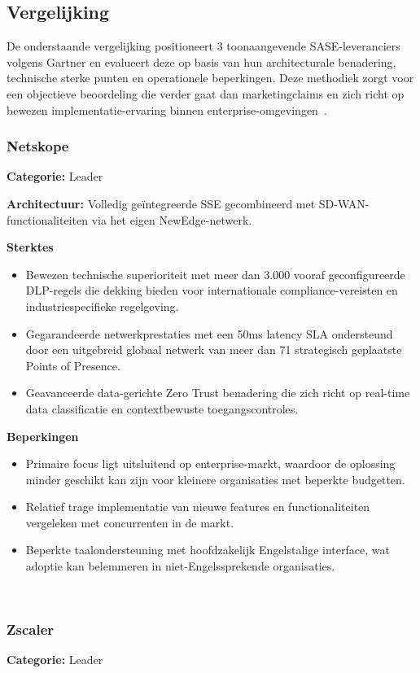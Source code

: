 \subsection{Vergelijking}
De onderstaande vergelijking positioneert 3 toonaangevende SASE-leveranciers volgens Gartner en evalueert deze op basis van hun architecturale benadering, technische sterke punten en operationele beperkingen. Deze methodiek zorgt voor een objectieve beoordeling die verder gaat dan marketingclaims en zich richt op bewezen implementatie-ervaring binnen enterprise-omgevingen~\autocite{Gartner2025}.

\subsubsection{Netskope}
\textbf{Categorie:} Leader

\textbf{Architectuur:}  Volledig geïntegreerde SSE gecombineerd met SD-WAN-functionaliteiten via het eigen NewEdge-netwerk.

\textbf{Sterktes}
\begin{itemize}
    \item Bewezen technische superioriteit met meer dan 3.000 vooraf geconfigureerde DLP-regels die dekking bieden voor internationale compliance-vereisten en industriespecifieke regelgeving.
    \item Gegarandeerde netwerkprestaties met een 50ms latency SLA ondersteund door een uitgebreid globaal netwerk van meer dan 71 strategisch geplaatste Points of Presence.
    \item Geavanceerde data-gerichte Zero Trust benadering die zich richt op real-time data classificatie en contextbewuste toegangscontroles.
\end{itemize}

\textbf{Beperkingen}
\begin{itemize}
    \item Primaire focus ligt uitsluitend op enterprise-markt, waardoor de oplossing minder geschikt kan zijn voor kleinere organisaties met beperkte budgetten.
    \item Relatief trage implementatie van nieuwe features en functionaliteiten vergeleken met concurrenten in de markt.
    \item Beperkte taalondersteuning met hoofdzakelijk Engelstalige interface, wat adoptie kan belemmeren in niet-Engelssprekende organisaties.
\end{itemize}
~\autocite{Gartner2025}

\subsubsection{Zscaler}
\textbf{Categorie:} Leader

